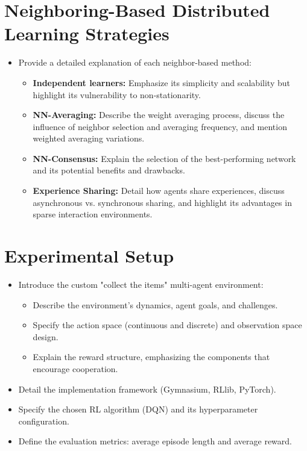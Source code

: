 \documentclass[sigconf]{acmart}
\begin{document}
\section{Neighboring-Based Distributed Learning Strategies}
\begin{itemize}
\item Provide a detailed explanation of each neighbor-based method:
\begin{itemize}
\item \textbf{Independent learners:} Emphasize its simplicity and scalability but highlight its vulnerability to non-stationarity.
\item \textbf{NN-Averaging:} Describe the weight averaging process, discuss the influence of neighbor selection and averaging frequency, and mention weighted averaging variations.
\item \textbf{NN-Consensus:} Explain the selection of the best-performing network and its potential benefits and drawbacks.
\item \textbf{Experience Sharing:} Detail how agents share experiences, discuss asynchronous vs. synchronous sharing, and highlight its advantages in sparse interaction environments.
\end{itemize}
\end{itemize}
\section{Experimental Setup}
\begin{itemize}
\item Introduce the custom "collect the items" multi-agent environment:
\begin{itemize}
\item Describe the environment's dynamics, agent goals, and challenges.
\item Specify the action space (continuous and discrete) and observation space design.
\item Explain the reward structure, emphasizing the components that encourage cooperation.
\end{itemize}
\item Detail the implementation framework (Gymnasium, RLlib, PyTorch).
\item Specify the chosen RL algorithm (DQN) and its hyperparameter configuration.
\item Define the evaluation metrics: average episode length and average reward.
\end{itemize}
\end{document}
